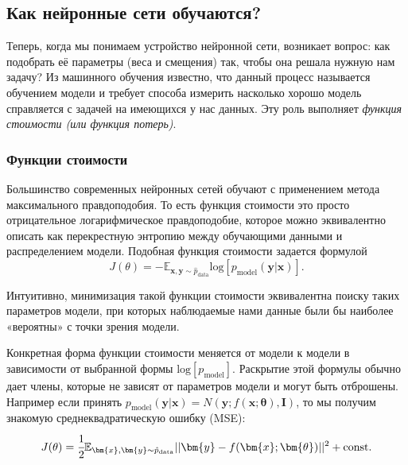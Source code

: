 

\subsection{Как нейронные сети обучаются?}

Теперь, когда мы понимаем устройство нейронной сети, возникает вопрос: 
как подобрать её параметры (веса и смещения) так, чтобы она решала нужную нам задачу? 
Из машинного обучения известно, что данный процесс называется обучением модели и требует 
способа измерить насколько хорошо модель справляется с задачей на имеющихся у нас данных. 
Эту роль выполняет \textit{функция стоимости (или функция потерь)}.

\subsubsection{Функции стоимости}

Большинство современных нейронных сетей обучают с применением метода максимального 
правдоподобия. То есть функция стоимости это просто отрицательное логарифмическое 
правдоподобие, которое можно эквивалентно описать как перекрестную энтропию 
между обучающими данными и распределением модели. Подобная функция стоимости 
задается формулой 
\begin{equation*}
    J(\theta) = - \mathbb{E}_{\bm{x},\bm{y} \sim \hat{p}_{\text{data}}} \text{log} \left[ p_\text{model} (\bm{y} | \bm{x}) \right].
\end{equation*}

Интуитивно, минимизация такой функции стоимости эквивалентна поиску таких параметров 
модели, при которых наблюдаемые нами данные были бы наиболее «вероятны» с точки 
зрения модели.

Конкретная форма функции стоимости меняется от модели к модели в зависимости от выбранной 
формы $\text{log} \left[ p_\text{model} \right]$. Раскрытие этой формулы обычно дает члены, которые не
зависят от параметров модели и могут быть отброшены. Например если принять 
$p_\text{model}(\bm{y} | \bm{x}) = N(\bm{y}; f(\bm{x}; \bm{\theta}), \bm{I})$, то 
мы получим знакомую среднеквадратическую ошибку (MSE):
\begin{equation*}
    J(\theta) = \cfrac{1}{2} \mathbb{E}_{\bm{x},\bm{y} \sim \hat{p}_{\text{data}}} || \bm{y} - f(\bm{x}; \bm{\theta}) ||^2 + \text{const}.
\end{equation*}

